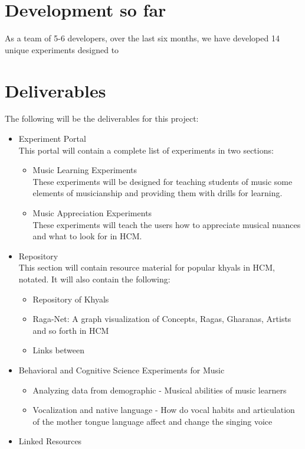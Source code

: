 \documentclass{tufte-handout}
\begin{document}
\section{Development so far}
As a team of 5-6 developers, over the last six months, we have developed 14 unique experiments designed to 

\section{Deliverables}
The following will be the deliverables for this project:
\begin{itemize}

\item Experiment Portal\\
This portal will contain a complete list of experiments in two sections:
\begin{itemize}
\item Music Learning Experiments\\
These experiments will be designed for teaching students of music some elements of musicianship and providing them with drills for learning.
\item Music Appreciation Experiments\\
These experiments will teach the users how to appreciate musical nuances and what to look for in HCM.

\end{itemize}
\item Repository\\
This section will contain resource material for popular khyals in HCM, notated. It will also contain the following:
\begin{itemize}
\item Repository of Khyals
\item Raga-Net: A graph visualization of Concepts, Ragas, Gharanas, Artists and so forth in HCM
\item Links between 
\end{itemize}

\item Behavioral and Cognitive Science Experiments for Music\\
\begin{itemize}
\item Analyzing data from demographic - Musical abilities of music learners 
\item Vocalization and native language - How do vocal habits and articulation of the mother tongue language affect and change the singing voice

\end{itemize}

\item Linked Resources\\

\end{itemize}
\end{document}
